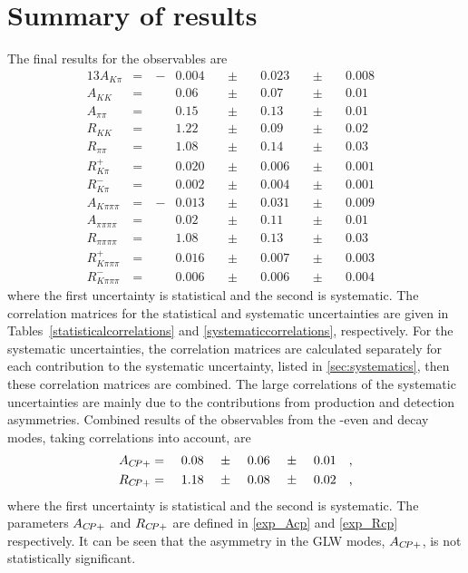 \section{Summary of results}
\label{sec:cpfit:summary}

The final results for the \CP observables are  
\begin{alignat*}{13}
A_{K\pi} &= &\ -&0.004&\ &\pm&\ &0.023&\ &\pm&\ &0.008& \\
A_{KK} &= &&0.06&\ &\pm&\ &0.07&\ &\pm&\ &0.01& \\
A_{\pi\pi} &= &&0.15&\ &\pm&\ &0.13&\ &\pm&\ &0.01& \\
R_{KK} &= &&1.22&\ &\pm&\ &0.09&\ &\pm&\ &0.02& \\
R_{\pi\pi} &= &&1.08&\ &\pm&\ &0.14&\ &\pm&\ &0.03& \\
R^+_{K\pi} &= &&0.020&\ &\pm&\ &0.006&\ &\pm&\ &0.001& \\ 
R^-_{K\pi} &= &&0.002&\ &\pm&\ &0.004&\ &\pm&\ &0.001& \\
A_{K\pi\pi\pi} &= &\ -&0.013&\ &\pm&\ &0.031&\ &\pm&\ &0.009& \\
A_{\pi\pi\pi\pi} &= &&0.02&\ &\pm&\ &0.11&\ &\pm&\ &0.01& \\
R_{\pi\pi\pi\pi} &= &&1.08&\ &\pm&\ &0.13&\ &\pm&\ &0.03& \\
R^+_{K\pi\pi\pi} &= &&0.016&\ &\pm&\ &0.007&\ &\pm&\ &0.003& \\ 
R^-_{K\pi\pi\pi} &= &&0.006&\ &\pm&\ &0.006&\ &\pm&\ &0.004&
\end{alignat*}
where the first uncertainty is statistical and the second is systematic. The correlation matrices for the statistical and systematic uncertainties are given in Tables~\ref{statisticalcorrelations} and \ref{systematiccorrelations}, respectively. For the systematic uncertainties, the correlation matrices are calculated separately for each contribution to the systematic uncertainty, listed in \sect\ref{sec:systematics}, then these correlation matrices are combined. The large correlations of the systematic uncertainties are mainly due to the contributions from production and detection asymmetries. Combined results of the \CP observables from the \CP-even \kk and \pipi decay modes, taking correlations into account, are
\begin{alignat*}{13}
A_{\CP+} &= &\ &0.08&\ &\pm&\ &0.06&\ &\pm&\ &0.01& \text{,}\\
R_{\CP+} &= &\ &1.18&\ &\pm&\ &0.08&\ &\pm&\ &0.02& \text{,}
\end{alignat*}
where the first uncertainty is statistical and the second is systematic. The parameters $A_{{C\!P}+}$ and $R_{{C\!P}+}$ are defined in \eqns\ref{exp_Acp} and \ref{exp_Rcp} respectively. It can be seen that the asymmetry in the GLW modes, $A_{{C\!P}+}$, is not statistically significant. 

